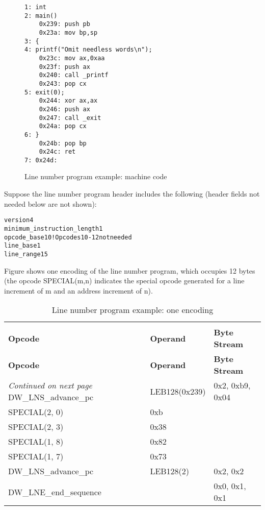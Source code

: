 \begin{figure}[here]
\begin{lstlisting}
1: int
2: main()
    0x239: push pb
    0x23a: mov bp,sp
3: {
4: printf("Omit needless words\n");
    0x23c: mov ax,0xaa
    0x23f: push ax
    0x240: call _printf
    0x243: pop cx
5: exit(0);
    0x244: xor ax,ax
    0x246: push ax
    0x247: call _exit
    0x24a: pop cx
6: }
    0x24b: pop bp
    0x24c: ret
7: 0x24d:
\end{lstlisting}
\caption{Line number program example: machine code} \label{fig:linenumberprogramexamplemachinecode}
\end{figure}

Suppose the line number program header includes the following
(header fields not needed below are not shown):



\begin{alltt}
version                    4
minimum_instruction_length 1
opcode_base               10 ! Opcodes 10-12 not needed
line_base                  1
line_range                15
\end{alltt}


Figure 
shows one encoding of the line number program, which occupies
12 bytes (the opcode SPECIAL(m,n) indicates the special opcode
generated for a line increment of m and an address increment
of n).


\begin{centering}
\setlength{\extrarowheight}{0.1cm}
\begin{longtable}{lll}
  \caption{Line number program example: one encoding} \label{tab:linenumberprogramexampleoneencoding} \\
  \hline \\ \bfseries Opcode &\bfseries Operand &\bfseries Byte Stream \\ \hline
\endfirsthead
  \bfseries Opcode &\bfseries Operand &\bfseries Byte Stream\\ \hline
\endhead
  \hline \emph{Continued on next page}
\endfoot
  \hline
\endlastfoot
DW\_LNS\_advance\_pc&LEB128(0x239)&0x2, 0xb9, 0x04 \\
SPECIAL(2, 0)&0xb  & \\
SPECIAL(2, 3)&0x38 & \\
SPECIAL(1, 8)&0x82 & \\
SPECIAL(1, 7)&0x73 & \\
DW\_LNS\_advance\_pc&LEB128(2)&0x2, 0x2 \\
DW\_LNE\_end\_sequence &&0x0, 0x1, 0x1 \\
\end{longtable}
\end{centering}


